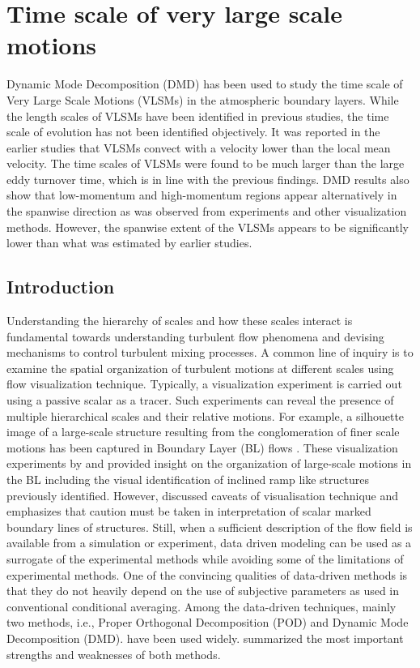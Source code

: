 \chapter{Time scale of very large scale motions}\label{chap:chap3}
Dynamic Mode Decomposition (DMD) has been used to study the time scale of Very Large Scale Motions (VLSMs) in the atmospheric boundary layers. While the length scales of VLSMs have been identified in previous studies, the time scale of evolution has not been identified objectively. It was reported in the earlier studies that VLSMs convect with a velocity lower than the local mean velocity. The time scales of VLSMs were found to be much larger than the large eddy turnover time, which is in line with the previous findings. DMD results also show that low-momentum and high-momentum regions appear alternatively in the spanwise direction as was observed from experiments and other visualization methods. However, the spanwise extent of the VLSMs appears to be significantly lower than what was estimated by earlier studies.


\section{Introduction}
Understanding the hierarchy of scales and how these scales interact is fundamental towards understanding  turbulent flow phenomena and devising mechanisms to control turbulent mixing processes. A common line of inquiry is to examine the spatial organization of turbulent motions at different scales using flow visualization technique. Typically, a visualization experiment is carried out using a passive scalar as a tracer. Such experiments can reveal the presence of multiple hierarchical scales and their relative motions. For example, a silhouette image of a large-scale structure resulting from the conglomeration of finer scale motions has been captured in  Boundary Layer (BL) flows \citep{falco_pof_77, hommema_adrian_blm_03}. These visualization experiments by \citet{falco_pof_77} and \citet{hommema_adrian_blm_03} provided insight on the organization of large-scale motions in the BL including the visual identification of inclined ramp like structures previously identified. However, \citet{hussain_1986_jfm} discussed caveats of visualisation technique and emphasizes that caution must be taken in interpretation of scalar marked boundary lines of structures. Still, when a sufficient description of the flow field is available from a simulation or experiment, data driven modeling can be used as a surrogate of the experimental methods while avoiding some of the limitations of experimental methods. One of the convincing qualities of data-driven methods is that they  do not heavily depend on the use of subjective parameters as used in conventional conditional averaging. Among the data-driven techniques, mainly two methods, i.e., Proper Orthogonal Decomposition (POD) \citep[eg., ][]{li_bouzeid_blm_2011,muld_compFluids_2012} and Dynamic Mode Decomposition (DMD). \citep[eg., ][]{bagheri_jfm2013,liu_ExpF_2015,muld_compFluids_2012} have been used widely. \citet{taira_arxiv_2017} summarized the most important strengths and weaknesses of both methods. 

